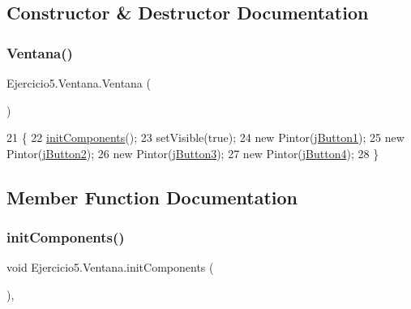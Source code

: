 \subsection{Constructor \& Destructor Documentation}
\mbox{\label{class_ejercicio5_1_1_ventana_af500cbb97dc8386f5c85ac586ae6f27c}} 
\subsubsection{\texorpdfstring{Ventana()}{Ventana()}}
{\footnotesize\ttfamily Ejercicio5.\+Ventana.\+Ventana (\begin{DoxyParamCaption}{ }\end{DoxyParamCaption})\hspace{0.3cm}{\ttfamily [inline]}}


\begin{DoxyCode}
21                      \{
22         \mbox{\hyperlink{class_ejercicio5_1_1_ventana_a289f25e67f2066d3c811dedfea83b8b5}{initComponents}}();
23         setVisible(\textcolor{keyword}{true});
24         \textcolor{keyword}{new} Pintor(\mbox{\hyperlink{class_ejercicio5_1_1_ventana_a702e08175eb5d9e0c166057793e3485f}{jButton1}});
25         \textcolor{keyword}{new} Pintor(\mbox{\hyperlink{class_ejercicio5_1_1_ventana_a88c68c1181c9c77989b5bc2dc1077e61}{jButton2}});
26         \textcolor{keyword}{new} Pintor(\mbox{\hyperlink{class_ejercicio5_1_1_ventana_ad6b3375b47f266259e624fe196b01145}{jButton3}});
27         \textcolor{keyword}{new} Pintor(\mbox{\hyperlink{class_ejercicio5_1_1_ventana_ab6ffbdcee4107a3c8b53abc7c160db05}{jButton4}});
28     \}
\end{DoxyCode}


\subsection{Member Function Documentation}
\mbox{\label{class_ejercicio5_1_1_ventana_a289f25e67f2066d3c811dedfea83b8b5}} 
\subsubsection{\texorpdfstring{init\+Components()}{initComponents()}}
{\footnotesize\ttfamily void Ejercicio5.\+Ventana.\+init\+Components (\begin{DoxyParamCaption}{ }\end{DoxyParamCaption})\hspace{0.3cm}{\ttfamily [inline]}, {\ttfamily [private]}}


